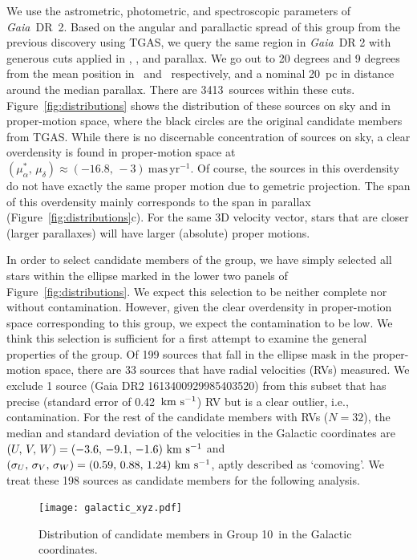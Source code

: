 \documentclass[modern,letterpaper]{aastex61}
\newcommand{\project}[1]{\textsl{#1}}
\newcommand{\acronym}[1]{{\small{#1}}}
\newcommand{\gaia}{\project{Gaia}}
\newcommand{\figname}{Figure}
\newcommand{\tgas}{\acronym{TGAS}}
\newcommand{\groupTen}{Group 10}
\newcommand{\kms}{\ensuremath{\rm km~s^{-1}}}
\newcommand{\ra}{\text{R.A.}}
\newcommand{\dec}{\text{Decl.}}
\newcommand{\pmra}{\ensuremath{\mu_\alpha^*}}
\newcommand{\pmdec}{\ensuremath{\mu_\delta}}
\newcommand{\masyr}{\ensuremath{\mathrm{mas}\,\mathrm{yr}^{-1}}}
\newcommand{\nstarsInRegion}{3413}
\begin{document}
We use the astrometric, photometric, and spectroscopic parameters of
\gaia\ DR~2.
Based on the angular and parallactic spread of this group from the previous
discovery using \tgas, we query the same region in \gaia\ DR 2 with generous
cuts applied in \ra, \dec, and parallax.
We go out to 20 degrees and 9 degrees from the mean position in \ra\ and \dec\
respectively, and a nominal 20~pc in distance around the median parallax.
There are \nstarsInRegion\ sources within these cuts.
Figure~\ref{fig:distributions} shows the distribution of these sources on sky
and in proper-motion space, where the black circles are
the original candidate members from \tgas.
While there is no discernable concentration of sources on sky,
a clear overdensity is found in proper-motion space at
$(\pmra,\,\pmdec)\approx(-16.8,\,-3)~\masyr$.
Of course, the sources in this overdensity do not have exactly the same proper motion
due to gemetric projection.
The span of this overdensity mainly corresponds to the span in parallax
(\figname~\ref{fig:distributions}c).
For the same 3D velocity vector, stars that are closer (larger parallaxes) will
have larger (absolute) proper motions.

In order to select candidate members of the group,
we have simply selected all stars within the ellipse marked in the lower two
panels of \figname~\ref{fig:distributions}.
We expect this selection to be neither complete nor without contamination.
However, given the clear overdensity in proper-motion space corresponding to
this group, we expect the contamination to be low.
We think this selection is sufficient for a first attempt to examine the general
properties of the group.
Of 199 sources that fall in the ellipse mask in the proper-motion space,
there are 33 sources that have radial velocities (RVs) measured.
We exclude 1 source (Gaia DR2 1613400929985403520)
from this subset that has precise (standard error of 0.42~\kms) RV but is
a clear outlier, i.e., contamination.
For the rest of the candidate members with RVs ($N=32$),
the median and standard deviation of the velocities in the Galactic coordinates
are $(U,\,V,\,W) = (-3.6,\,-9.1,\,-1.6)~\kms$ and
$(\sigma_U,\,\sigma_V,\,\sigma_W) = (0.59,\,0.88,\,1.24)~\kms$,
aptly described as `comoving'.
We treat these 198 sources as candidate members for the following analysis.



\begin{figure}
  \texttt{[image: galactic\_xyz.pdf]}
  \caption{Distribution of candidate members in \groupTen\ in
    the Galactic coordinates.}
  \label{fig:galactic_xyz}
\end{figure}
\end{document}

